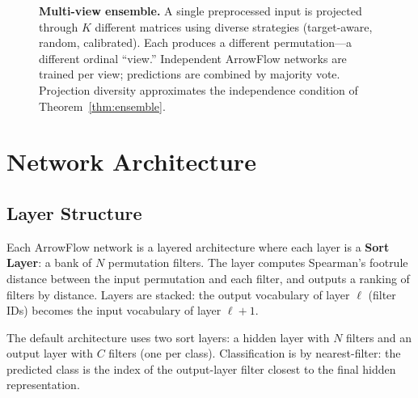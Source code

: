 \documentclass[12pt]{article}
\begin{document}
\begin{figure}[t]
{%
}
\caption{\textbf{Multi-view ensemble.} A single preprocessed input is projected through $K$ different matrices using diverse strategies (target-aware, random, calibrated). Each produces a different permutation---a different ordinal ``view.'' Independent ArrowFlow networks are trained per view; predictions are combined by majority vote. Projection diversity approximates the independence condition of Theorem~\ref{thm:ensemble}.}
\label{fig:ensemble}
\end{figure}


\section{Network Architecture}
\label{sec:architecture}

\subsection{Layer Structure}
Each ArrowFlow network is a layered architecture where each layer is a \textbf{Sort Layer}: a bank of $N$ permutation filters. The layer computes Spearman's footrule distance between the input permutation and each filter, and outputs a ranking of filters by distance. Layers are stacked: the output vocabulary of layer $\ell$ (filter IDs) becomes the input vocabulary of layer $\ell+1$.

The default architecture uses two sort layers: a hidden layer with $N$ filters and an output layer with $C$ filters (one per class). Classification is by nearest-filter: the predicted class is the index of the output-layer filter closest to the final hidden representation.
\end{document}
